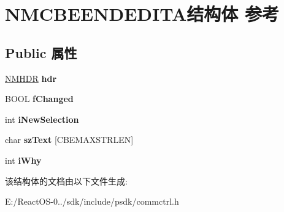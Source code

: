 \hypertarget{struct_n_m_c_b_e_e_n_d_e_d_i_t_a}{}\section{N\+M\+C\+B\+E\+E\+N\+D\+E\+D\+I\+T\+A结构体 参考}
\label{struct_n_m_c_b_e_e_n_d_e_d_i_t_a}
\subsection*{Public 属性}
\begin{DoxyCompactItemize}
\item 
\mbox{\label{struct_n_m_c_b_e_e_n_d_e_d_i_t_a_a9d03f32b812c5e8d0ac92ff8f8e7907a}} 
\hyperlink{structtag_n_m_h_d_r}{N\+M\+H\+DR} {\bfseries hdr}
\item 
\mbox{\label{struct_n_m_c_b_e_e_n_d_e_d_i_t_a_afc504509be35faa1edb1c3df4c63996c}} 
B\+O\+OL {\bfseries f\+Changed}
\item 
\mbox{\label{struct_n_m_c_b_e_e_n_d_e_d_i_t_a_a54c18e1101487b4b35909d1b00b54f8f}} 
int {\bfseries i\+New\+Selection}
\item 
\mbox{\label{struct_n_m_c_b_e_e_n_d_e_d_i_t_a_a44f41660671a0c69534b758217f89944}} 
char {\bfseries sz\+Text} \mbox{[}C\+B\+E\+M\+A\+X\+S\+T\+R\+L\+EN\mbox{]}
\item 
\mbox{\label{struct_n_m_c_b_e_e_n_d_e_d_i_t_a_ae0d1a37aaa9d3f0f63aea09aa4085835}} 
int {\bfseries i\+Why}
\end{DoxyCompactItemize}


该结构体的文档由以下文件生成\+:\begin{DoxyCompactItemize}
\item 
E\+:/\+React\+O\+S-\/0../sdk/include/psdk/commctrl.\+h\end{DoxyCompactItemize}
